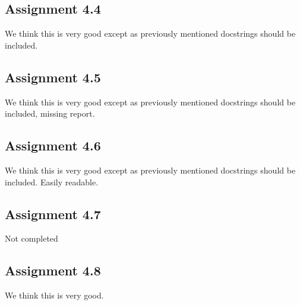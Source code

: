 \documentclass[a4paper]{article}
\begin{document}
\subsection*{Assignment 4.4}
We think this is very good except as previously mentioned docstrings should be included.
\subsection*{Assignment 4.5} 
We think this is very good except as previously mentioned docstrings should be included, missing report.
\subsection*{Assignment 4.6}
We think this is very good except as previously mentioned docstrings should be included. Easily readable. 

\subsection*{Assignment 4.7}
Not completed

\subsection*{Assignment 4.8}
We think this is very good.









\end{document}
